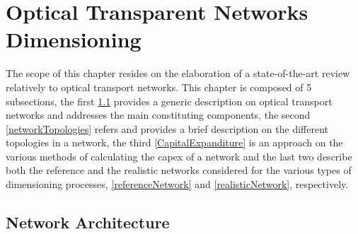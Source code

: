 \chapter{Optical Transparent Networks Dimensioning}
\label{chapter2}

The scope of this chapter resides on the elaboration of a state-of-the-art review relatively to optical transport networks. This chapter is composed of 5 subsections, the first \ref{networkArchitecture} provides a generic description on optical transport networks and addresses the main constituting  components, the second \ref{networkTopologies} refers and provides a brief description on the different topologies in a network, the third \ref{CapitalExpanditure} is an approach on the various methods of calculating the \gls{capex} of a network and the last two describe both the reference and the realistic networks considered for the various types of dimensioning processes, \ref{referenceNetwork} and \ref{realisticNetwork}, respectively.

\section{Network Architecture}
\label{networkArchitecture}

